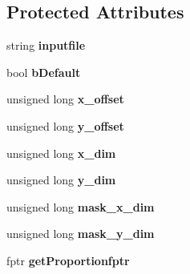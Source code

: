 \subsection*{Protected Attributes}
\begin{DoxyCompactItemize}
\item 
string {\bfseries inputfile}\hypertarget{class_data_mask_acde16cc845a6102a8b2ee0aa9b8917cb}{}\label{class_data_mask_acde16cc845a6102a8b2ee0aa9b8917cb}

\item 
bool {\bfseries b\+Default}\hypertarget{class_data_mask_af5d895b50f04eceac1e473dee6f36703}{}\label{class_data_mask_af5d895b50f04eceac1e473dee6f36703}

\item 
unsigned long {\bfseries x\+\_\+offset}\hypertarget{class_data_mask_a70178c907b2dc072b62f4bfb8f690823}{}\label{class_data_mask_a70178c907b2dc072b62f4bfb8f690823}

\item 
unsigned long {\bfseries y\+\_\+offset}\hypertarget{class_data_mask_ab4508058d8563d90bfc606a648cedb2f}{}\label{class_data_mask_ab4508058d8563d90bfc606a648cedb2f}

\item 
unsigned long {\bfseries x\+\_\+dim}\hypertarget{class_data_mask_aba77e907211dea06a4a52ad3036716b0}{}\label{class_data_mask_aba77e907211dea06a4a52ad3036716b0}

\item 
unsigned long {\bfseries y\+\_\+dim}\hypertarget{class_data_mask_aa2c689edd7b8bd84bb60e836aac4e378}{}\label{class_data_mask_aa2c689edd7b8bd84bb60e836aac4e378}

\item 
unsigned long {\bfseries mask\+\_\+x\+\_\+dim}\hypertarget{class_data_mask_ab971fd5a14a17e850cd92c79c3a1543e}{}\label{class_data_mask_ab971fd5a14a17e850cd92c79c3a1543e}

\item 
unsigned long {\bfseries mask\+\_\+y\+\_\+dim}\hypertarget{class_data_mask_a5ab1bf33e9b9fac964c8c2576fc5edca}{}\label{class_data_mask_a5ab1bf33e9b9fac964c8c2576fc5edca}

\item 
fptr {\bfseries get\+Proportionfptr}\hypertarget{class_data_mask_a67c92c63f3397de5312c573281515c1c}{}\label{class_data_mask_a67c92c63f3397de5312c573281515c1c}

\end{DoxyCompactItemize}


